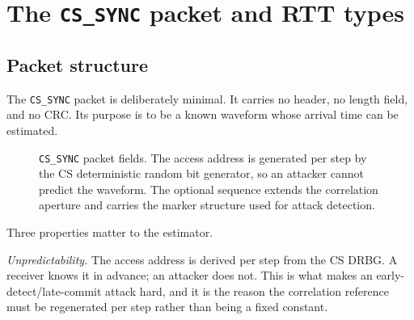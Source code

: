 \documentclass[11pt,a4paper]{article}
\newcommand{\code}[1]{\texttt{\small #1}}
\begin{document}
\section{The \code{CS\_SYNC} packet and RTT types}
\label{sec:packet}

\subsection{Packet structure}

The \code{CS\_SYNC} packet is deliberately minimal. It carries no header, no length field, and no
CRC. Its purpose is to be a known waveform whose arrival time can be estimated.

\begin{figure}[h]
\centering
{}
\caption{\code{CS\_SYNC} packet fields. The access address is generated per step by the CS
deterministic random bit generator, so an attacker cannot predict the waveform. The optional
sequence extends the correlation aperture and carries the marker structure used for attack
detection.}
\label{fig:packet}
\end{figure}

Three properties matter to the estimator.

\emph{Unpredictability.} The access address is derived per step from the CS DRBG. A receiver knows
it in advance; an attacker does not. This is what makes an early-detect/late-commit attack hard,
and it is the reason the correlation reference must be regenerated per step rather than being a
fixed constant.
\end{document}
